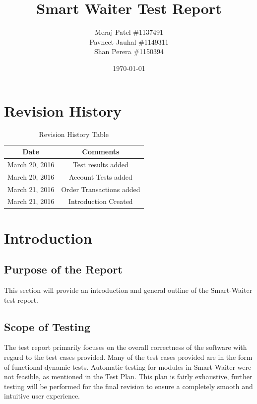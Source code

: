 \documentclass[12pt, titlepage]{article}
\begin{document}
\title{Smart Waiter Test Report} 
\author{Meraj Patel \#1137491 \\ Pavneet Jauhal \#1149311\\ Shan Perera \#1150394}
\date{\today}
\maketitle

\tableofcontents 

\listoftables

\begin{table}[H]
\section*{Revision History}
\begin{tabular}{|c|c|}
\hline
\textbf{Date}  & \textbf{Comments} \\ \hline
March 20, 2016 & Test results added \\
\hline
March 20, 2016 & Account Tests added \\
\hline
March 21, 2016 & Order Transactions added \\
\hline
March 21, 2016 & Introduction Created \\
\hline
\end{tabular}
\caption{Revision History Table}
\end{table}

\section{Introduction}
\subsection{Purpose of the Report}
This section will provide an introduction and general outline of the Smart-Waiter test report. 

\subsection{Scope of Testing}
The test report primarily focuses on the overall correctness of the software with regard to the test cases provided. Many of the test cases provided are in the form of functional dynamic tests. Automatic testing for modules in Smart-Waiter were not feasible, as mentioned in the Test Plan. This plan is fairly exhaustive, further testing will be performed for the final revision to ensure a completely smooth and intuitive user experience.
\end{document}
